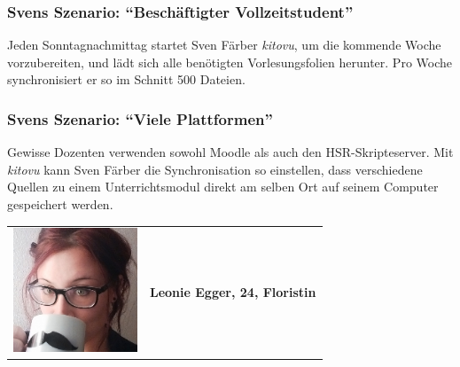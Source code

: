 \documentclass[a4paper]{article}
\begin{document}
\subsubsection{Svens Szenario: ``Beschäftigter Vollzeitstudent''}

Jeden Sonntagnachmittag startet Sven Färber \emph{kitovu}, um die kommende Woche vorzubereiten, und lädt sich alle benötigten Vorlesungsfolien herunter. Pro Woche synchronisiert er so im Schnitt 500 Dateien.

\subsubsection{Svens Szenario: ``Viele Plattformen''}

Gewisse Dozenten verwenden sowohl Moodle als auch den HSR-Skripteserver. Mit \emph{kitovu} kann Sven Färber die Synchronisation so einstellen, dass verschiedene Quellen zu einem Unterrichtsmodul direkt am selben Ort auf seinem Computer gespeichert werden.

\pagebreak
\begin{tabulary}{\linewidth}{m{10em}l}
	\includegraphics[width=10em]{./img/diverseui01.png} & \textbf{{\large Leonie Egger, 24, Floristin}} \\
\end{tabulary}
\end{document}
